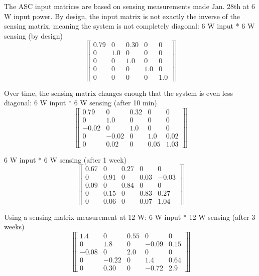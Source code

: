 The ASC input matrices are based on sensing measurements made Jan. 28th at 6 W 
input power. By design, the input matrix is not exactly the inverse of the 
sensing matrix, meaning the system is not completely diagonal:
 6 W input * 6 W sensing (by design)
 \[ \left\llbracket \begin{array}{ccccc}
0.79 & 0 & 0.30 & 0 & 0 \\
0 & 1.0 & 0 & 0 & 0 \\
0 & 0 & 1.0 & 0 & 0 \\
0 & 0 & 0 & 1.0 & 0 \\
0 & 0 & 0 & 0 & 1.0 
\end{array} \right\rrbracket\] 

Over time, the sensing matrix changes enough that the system is even less 
diagonal:
6 W input * 6 W sensing (after 10 min)
 \[ \left\llbracket \begin{array}{ccccc}
0.79 & 0 & 0.32 & 0 & 0 \\
0 & 1.0 & 0 & 0 & 0 \\
-0.02 & 0 & 1.0 & 0 & 0 \\
0 & -0.02 & 0 & 1.0 & 0.02 \\
0 & 0.02 & 0 & 0.05 & 1.03 
\end{array} \right\rrbracket\] 

6 W input * 6 W sensing (after 1 week)
 \[ \left\llbracket \begin{array}{ccccc}
0.67 & 0 & 0.27 & 0 & 0 \\
0 & 0.91 & 0 & 0.03 & -0.03 \\
0.09 & 0 & 0.84 & 0 & 0 \\
0 & 0.15 & 0 & 0.83 & 0.27 \\
0 & 0.06 & 0 & 0.07 & 1.04 
\end{array} \right\rrbracket\] 

Using a sensing matrix measurement at 12 W:
6 W input * 12 W sensing (after 3 weeks)
 \[ \left\llbracket \begin{array}{ccccc}
1.4 & 0 & 0.55 & 0 & 0 \\
0 & 1.8 & 0 & -0.09 & 0.15 \\
-0.08 & 0 & 2.0 & 0 & 0 \\
0 & -0.22 & 0 & 1.4 & 0.64 \\
0 & 0.30 & 0 & -0.72 & 2.9 
\end{array} \right\rrbracket\] 




